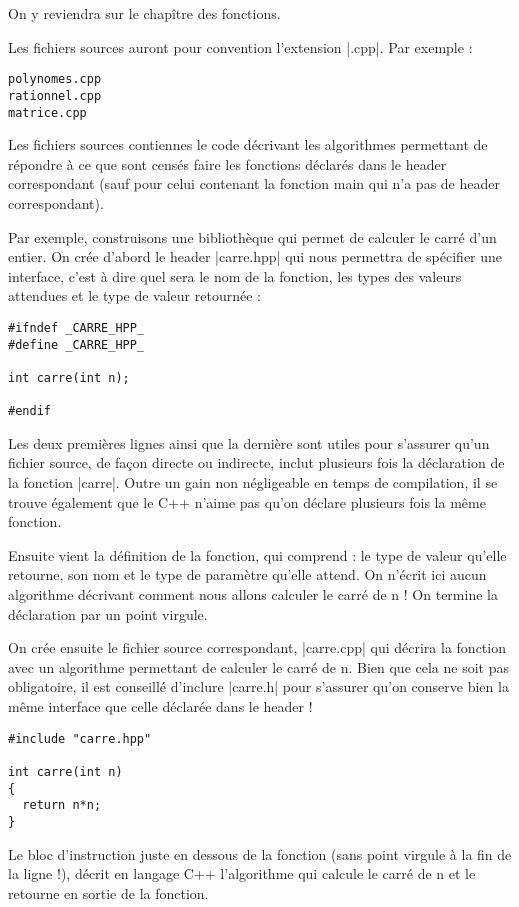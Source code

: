 On y reviendra sur le chapître des fonctions.

Les fichiers sources auront pour convention l'extension |.cpp|. Par exemple :
\begin{verbatim}
polynomes.cpp
rationnel.cpp
matrice.cpp
\end{verbatim}

Les fichiers sources contiennes le code décrivant les algorithmes permettant de répondre à ce que sont censés faire les fonctions déclarés dans le header correspondant (sauf pour celui contenant la fonction main qui n'a pas de header correspondant).

Par exemple, construisons une bibliothèque qui permet de calculer le carré d'un entier. On crée d'abord le header |carre.hpp| qui nous permettra de spécifier une interface, c'est à dire quel sera le nom de la fonction, les types des valeurs attendues et le type de valeur retournée :

\begin{lstlisting}
#ifndef _CARRE_HPP_
#define _CARRE_HPP_

int carre(int n);

#endif
\end{lstlisting}

Les deux premières lignes ainsi que la dernière sont utiles pour s'assurer qu'un fichier source, de façon directe ou indirecte, inclut plusieurs fois la déclaration de la fonction |carre|. Outre un gain non négligeable en temps de compilation, il se trouve également que le C++ n'aime pas qu'on déclare plusieurs fois la même fonction.

Ensuite vient la définition de la fonction, qui comprend : le type de valeur qu'elle retourne, son nom et le type de paramètre qu'elle attend. On n'écrit ici aucun algorithme décrivant comment nous allons calculer le carré de n ! On termine la déclaration par un point virgule.

On crée ensuite le fichier source correspondant, |carre.cpp| qui décrira la fonction avec un algorithme permettant de calculer le carré de n. Bien que cela ne soit pas obligatoire, il est conseillé d'inclure |carre.h| pour s'assurer qu'on conserve bien la même interface que celle déclarée dans le header !

\begin{lstlisting}
#include "carre.hpp"

int carre(int n)
{
  return n*n;
}
\end{lstlisting}

Le bloc d'instruction juste en dessous de la fonction (sans point virgule à la fin de la ligne !), décrit en langage C++ l'algorithme qui calcule le carré de n et le retourne en sortie de la fonction.


